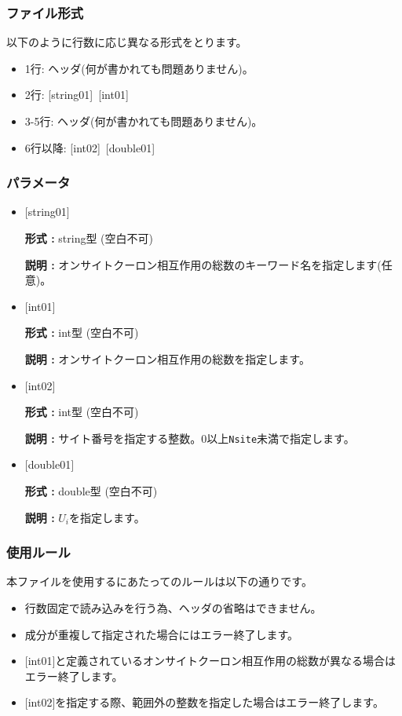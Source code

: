 \subsubsection{ファイル形式}
以下のように行数に応じ異なる形式をとります。
 \begin{itemize}
   \item  1行:  ヘッダ(何が書かれても問題ありません)。
   \item  2行:   [string01]~[int01]
   \item  3-5行:  ヘッダ(何が書かれても問題ありません)。
   \item  6行以降:
   [int02]~[double01] 
  \end{itemize}
\subsubsection{パラメータ}
 \begin{itemize}

   \item  $[$string01$]$
   
    {\bf 形式 :} string型 (空白不可)

   {\bf 説明 :} オンサイトクーロン相互作用の総数のキーワード名を指定します(任意)。

   \item  $[$int01$]$
   
    {\bf 形式 :} int型 (空白不可)

   {\bf 説明 :} オンサイトクーロン相互作用の総数を指定します。

  \item  $[$int02$]$
  
 {\bf 形式 :} int型 (空白不可)

{\bf 説明 :} サイト番号を指定する整数。0以上\verb|Nsite|{未満}で指定します。
 
 \item  $[$double01$]$
   
   {\bf 形式 :} double型 (空白不可)

  {\bf 説明 :}  $U_i$を指定します。
  
\end{itemize}

\subsubsection{使用ルール}
本ファイルを使用するにあたってのルールは以下の通りです。
\begin{itemize}
\item 行数固定で読み込みを行う為、ヘッダの省略はできません。
\item 成分が重複して指定された場合にはエラー終了します。
\item $[$int01$]$と定義されているオンサイトクーロン相互作用の総数が異なる場合はエラー終了します。
\item $[$int02$]$を指定する際、範囲外の整数を指定した場合はエラー終了します。
\end{itemize}


